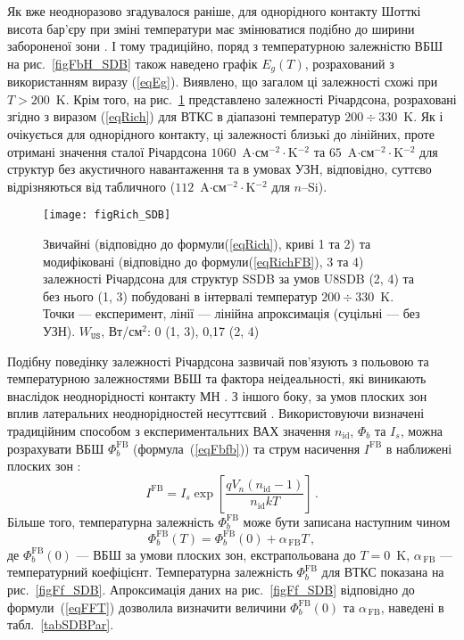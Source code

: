 Як вже неодноразово згадувалося раніше, для однорідного контакту Шотткі висота бар'єру при зміні температури має змінюватися подібно
до ширини забороненої зони \cite{Rhoderick1988,Aboelfotoh,Zhua}.
І тому традиційно, поряд з температурною залежністю ВБШ на рис.~\ref{figFbH_SDB} також наведено графік $E_g(T)$,
розрахований з використанням виразу (\ref{eqEg}).
Виявлено, що загалом ці залежності схожі при $T>200$~K.
Крім того, на рис.~\ref{figRich_SDB} представлено залежності Річардсона, розраховані згідно з
виразом (\ref{eqRich}) для ВТКС в діапазоні температур $200\div330$~K.
Як і очікується для однорідного контакту, ці залежності близькі до лінійних,
проте отримані значення сталої Річардсона $1060$~A$\cdot$см$^{-2}\cdot$K$^{-2}$ та $65$~A$\cdot$см$^{-2}\cdot$K$^{-2}$
для структур без акустичного навантаження та в умовах УЗН, відповідно, суттєво відрізняються
від табличного ($112$~A$\cdot$см$^{-2}\cdot$K$^{-2}$ для $n$--Si).


\begin{figure}
\center
\texttt{[image: figRich\_SDB]}
\caption{\label{figRich_SDB}
Звичайні (відповідно до формули(\ref{eqRich}), криві 1 та 2)
та модифіковані (відповідно до формули(\ref{eqRichFB}), 3 та 4)
залежності Річардсона для структур SSDB за умов U8SDB (2, 4) та без нього (1, 3) побудовані в інтервалі
температур $200\div330$~K.
Точки --- експеримент, лінії --- лінійна апроксимація (суцільні --- без УЗН).
$W_\mathtt{US}$,  Вт/см$^2$: 0 (1, 3), 0,17 (2, 4)
}%
\end{figure}

Подібну поведінку залежності Річардсона зазвичай пов'язують з польовою та температурною залежностями ВБШ та фактора неідеальності,
які виникають внаслідок неоднорідності контакту МН \cite{Sarpatwari,Aldemir}.
З іншого боку, за умов плоских зон вплив латеральних неоднорідностей несуттєвий \cite{Aldemir,Unewisse,Korkut}.
Використовуючи визначені традиційним способом з експериментальних ВАХ значення $n_\mathrm{id}$, $\Phi_b$ та $I_s$,
можна розрахувати ВБШ $\Phi_{b}^\mathrm{FB}$ (формула~(\ref{eqFbfb})) та струм насичення $I^\mathrm{FB}$ в наближені плоских зон \cite{Aldemir,Unewisse,Korkut}:
\begin{equation}\label{eqIfb}
I^\mathrm{FB}=I_s\exp\left[\frac{qV_n(n_\mathrm{id}-1)}{n_\mathrm{id}kT}\right]\,.
\end{equation}
Більше того, температурна залежність $\Phi_{b}^\mathrm{FB}$ може бути записана наступним чином
\begin{equation}
\label{eqFFT}
\Phi_{b}^\mathrm{FB}(T)=\Phi_{b}^\mathrm{FB}(0)+\alpha_\mathrm{\,FB} T \,,
\end{equation}
де
$\Phi_{b}^\mathrm{FB}(0)$ --- ВБШ за умови плоских зон, екстрапольована до $T = 0$~K,
$\alpha_\mathrm{\,FB}$ --- температурний коефіцієнт.
Температурна залежність $\Phi_{b}^\mathrm{FB}$ для ВТКС показана на рис.~\ref{figFf_SDB}.
Апроксимація даних на рис.~\ref{figFf_SDB} відповідно до формули~(\ref{eqFFT}) дозволила
визначити величини  $\Phi_{b}^\mathrm{FB}(0)$ та $\alpha_\mathrm{\,FB}$,
наведені в табл.~\ref{tabSDBPar}.


